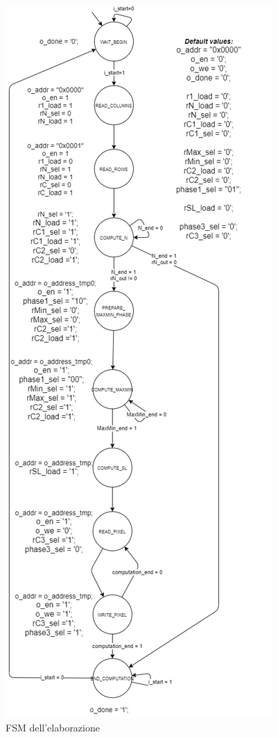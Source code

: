 \documentclass[11pt]{article} %
\begin{document}
\begin{figure}[h]
\centering
\includegraphics[scale=0.2995]{datapaths/FSM-vertical.png}
\caption{FSM dell'elaborazione}
\end{figure}
\end{document}
